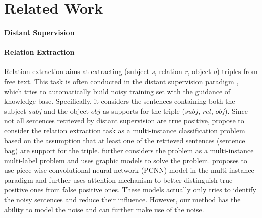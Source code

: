\section{Related Work}

\paragraph{Distant Supervision}


\paragraph{Relation Extraction} Relation extraction aims at extracting (subject \emph{s}, relation \emph{r}, object \emph{o}) triples from free text. This task is often conducted in the distant supervision paradigm \cite{mintz2009distant}, which tries to automatically build noisy training set with the guidance of knowledge base. Specifically, it considers the sentences containing both the subject $subj$ and the object $obj$ as supports for the triple ($subj$, $rel$, $obj$). Since not all sentences retrieved by distant supervision are true positive, \cite{riedel2010modeling} propose to consider the relation extraction task as a multi-instance classification problem based on the assumption that at least one of the retrieved sentences (sentence bag) are support for the triple. \cite{hoffmann2011knowledge,surdeanu2012multi} further considers the problem as a multi-instance multi-label problem and uses graphic models to solve the problem. \cite{zeng2015distant} proposes to use piece-wise convolutional neural network (PCNN) model in the multi-instance paradigm and \cite{lin2016neural} further uses attention mechanism to better distinguish true positive ones from false positive ones. These models actually only tries to identify the noisy sentences and reduce their influence. However, our method has the ability to model the noise and can further make use of the noise.

